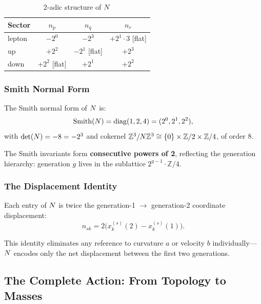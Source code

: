 \begin{table}[h]
\centering
\caption{2-adic structure of $N$}
\begin{tabular}{lccc}
\hline\hline
Sector & $n_p$ & $n_q$ & $n_r$ \\
\hline
lepton & $-2^0$ & $-2^3$ & $+2^1 \cdot 3$ [flat] \\
up & $+2^2$ & $-2^1$ [flat] & $+2^3$ \\
down & $+2^2$ [flat] & $+2^1$ & $+2^2$ \\
\hline\hline
\end{tabular}
\end{table}

\subsubsection{Smith Normal Form}

\begin{theorem}\label{thm:smith}
The Smith normal form of $N$ is:
\begin{equation}
\mathrm{Smith}(N) = \mathrm{diag}(1, 2, 4) = (2^0, 2^1, 2^2),
\end{equation}
with $\det(N) = -8 = -2^3$ and cokernel $\mathbb{Z}^3 / N\mathbb{Z}^3 \cong \{0\} \times \mathbb{Z}/2 \times \mathbb{Z}/4$, of order 8.
\end{theorem}

The Smith invariants form \textbf{consecutive powers of 2}, reflecting the generation hierarchy: generation $g$ lives in the sublattice $2^{g-1} \cdot \mathbb{Z}/4$.

\subsubsection{The Displacement Identity}

\begin{theorem}\label{thm:displacement}
Each entry of $N$ is twice the generation-1 $\to$ generation-2 coordinate displacement:
\begin{equation}
n_{sk} = 2\bigl(x_k^{(s)}(2) - x_k^{(s)}(1)\bigr).
\end{equation}
\end{theorem}

This identity eliminates any reference to curvature $a$ or velocity $b$ individually---$N$ encodes only the net displacement between the first two generations.

\subsection{The Complete Action: From Topology to Masses}\label{sec:complete_action}


